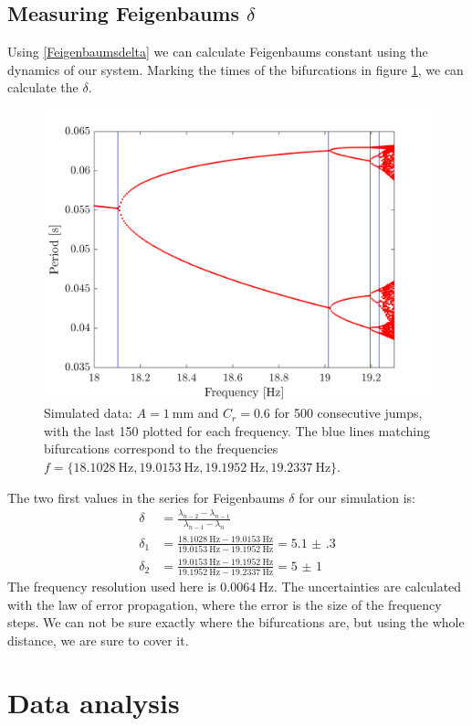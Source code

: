 \documentclass[12pt,oneside,a4paper]{article}
\numberwithin{equation}{section}
\begin{document}
{{{{\subsection{Measuring Feigenbaums $\delta$}
Using \eqref{Feigenbaumsdelta} we can calculate Feigenbaums constant using the dynamics of our system. Marking the times of the bifurcations in figure  \ref{feigsim}, we can calculate the $\delta$.
\begin{figure}[h]
\centering
\includegraphics[width=0.65\linewidth]{feigplot3.png} 
\caption{Simulated data: $A=\SI{1}{\mm}$ and $C_r=\num{0.6}$ for 500 consecutive jumps, with the last 150 plotted for each frequency. The blue lines matching bifurcations correspond to the frequencies $f=\{\SI{18.1028}{\hertz},\SI{19.0153}{\hertz},\SI{19.1952}{\hertz},\SI{19.2337}{\hertz} \}$.}\label{feigsim}
\end{figure}
The two first values in the series for Feigenbaums $\delta$ for our simulation is:
\begin{align}
\delta&=\frac{\lambda_{n-2} - \lambda_{n-1}}{\lambda_{n-1}-\lambda_n}\\
\delta_1&=\frac{\SI{18.1028}{\hertz}-\SI{19.0153}{\hertz}}{\SI{19.0153}{\hertz}-\SI{19.1952}{\hertz}} = \num{5.1(3)}\\
\delta_2&=\frac{\SI{19.0153}{\hertz}-\SI{19.1952}{\hertz}}{\SI{19.1952}{\hertz}-\SI{19.2337}{\hertz}} = \num{5(1)}
\end{align}
The frequency resolution used here is $\SI{0.0064}{\hertz}$. The uncertainties are calculated with the law of error propagation, where the error is the size of the frequency steps. We can not be sure exactly where the bifurcations are, but using the whole distance, we are sure to cover it.  
\section{Data analysis}
}}}}
\end{document}
